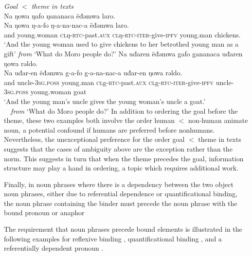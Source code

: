 \ea \textit{Goal $<$ theme in texts}\\
\ea Na ŋowa ŋafo ŋananaca ëđǝmwa laro.\\
\gll Na ŋowa ŋ-a-fo ŋ-a-na-nac-a ëđǝmwa laro.\\
and  young.woman  \textsc{cl}ŋ-\textsc{rtc}-past\textsc{.aux}  \textsc{cl}ŋ-\textsc{rtc-iter}-give-\textsc{ipfv}  young.man chickens.\\
\glt `And the young woman used to give chickens to her betrothed young man as a gift' \hfill \textit{from} `What do Moro people do?'
\ex Na uđaren ëđǝmwa gafo gananaca uđaren ŋowa rǝldo.\\
\gll Na  uđar-en ëđǝmwa g-a-fo g-a-na-nac-a uđar-en  ŋowa rǝldo.\\
and uncle-\textsc{3sg.poss} young.man \textsc{cl}g-\textsc{rtc}-past\textsc{.aux} \textsc{cl}g\textsc{-rtc}\textsc{-iter}-give\textsc{-ipfv} uncle-\textsc{3sg.poss} young.woman goat\\
\glt `And the young man's uncle gives the young woman’s uncle a goat.'\\ \ \  \textit{from} `What do Moro people do?'
\z
\z
In addition to ordering the goal before the theme, these two examples both involve the order human $<$ non-human animate noun, a potential confound if humans are preferred before nonhumans. Nevertheless, the unexceptional preference for the order goal $<$ theme in texts suggests that the cases of ambiguity above are the exception rather than the norm. This suggests in turn that when the theme precedes the goal, information structure may play a hand in ordering, a topic which requires additional work.

Finally, in noun phrases where there is a dependency between the two object noun phrases, either due to referential dependence or quantificational binding, the noun phrase containing the binder must precede the noun phrase with the bound pronoun or anaphor \citep[][p. 43-45]{Ackerman:2015} 

The requirement that noun phrases precede bound elements is illustrated in the following examples for reflexive binding , quantificational binding , and a referentially dependent pronoun .

